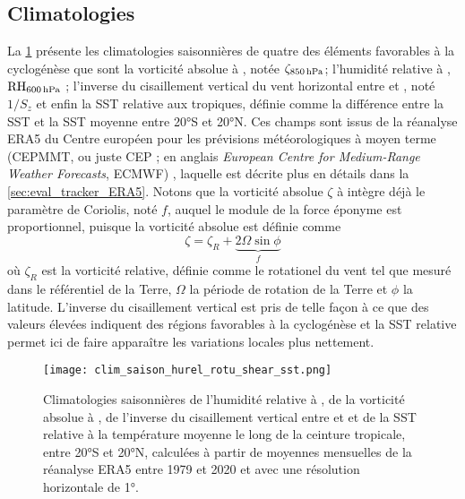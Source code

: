 \documentclass[../main.tex]{subfiles}
\begin{document}
\subsection{Climatologies}\label{sec:climato_ingredients}

La \cref{fig:clim_ingredients} présente les climatologies saisonnières de quatre des éléments favorables à la cyclogénèse que sont la vorticité absolue à
, notée $\zeta_{\text{\hPa{850}}}$; l'humidité relative à , $\text{RH}_{\text{\hPa{600}}}$ ; l'inverse du cisaillement vertical du vent
horizontal entre  et , noté $1/S_z$ et enfin la SST relative aux tropiques, définie comme la différence entre la SST et la SST moyenne entre
\ang{20}S et \ang{20}N. Ces champs sont issus de la réanalyse ERA5 du Centre européen pour les prévisions météorologiques à moyen terme (CEPMMT, ou juste CEP ;
en anglais \textit{European Centre for Medium-Range Weather Forecasts}, ECMWF) \parencite{hersbach_era5_2020}, laquelle est décrite plus en détails dans la
\cref{sec:eval_tracker_ERA5}. Notons que la vorticité absolue $\zeta$ à  intègre déjà le paramètre de Coriolis, noté $f$, auquel le module de la force
éponyme est proportionnel, puisque la vorticité absolue est définie comme
%
\begin{equation*}
    \zeta = \zeta_R + \underbrace{2 \Omega \sin \phi}_{f}
\end{equation*}
%
où $\zeta_R$ est la vorticité relative, définie comme le rotationel du vent tel que mesuré dans le référentiel de la Terre, $\Omega$ la période de
rotation de la Terre et $\phi$ la latitude. L'inverse du cisaillement vertical est pris de telle façon à ce que des valeurs élevées indiquent des régions
favorables à la cyclogénèse et la SST relative permet ici de faire apparaître les variations locales plus nettement.

\begin{figure}[tp]
    \centering
    \texttt{[image: clim\_saison\_hurel\_rotu\_shear\_sst.png]}
    \caption{Climatologies saisonnières de l'humidité relative à , de la vorticité absolue à , de l'inverse du cisaillement vertical entre
     et  et de la SST relative à la température moyenne le long de la ceinture tropicale, entre \ang{20}S et \ang{20}N, calculées à partir de
    moyennes mensuelles de la réanalyse ERA5 entre 1979 et 2020 et avec une résolution horizontale de \ang{1}.}
    \label{fig:clim_ingredients}
\end{figure}
\end{document}
